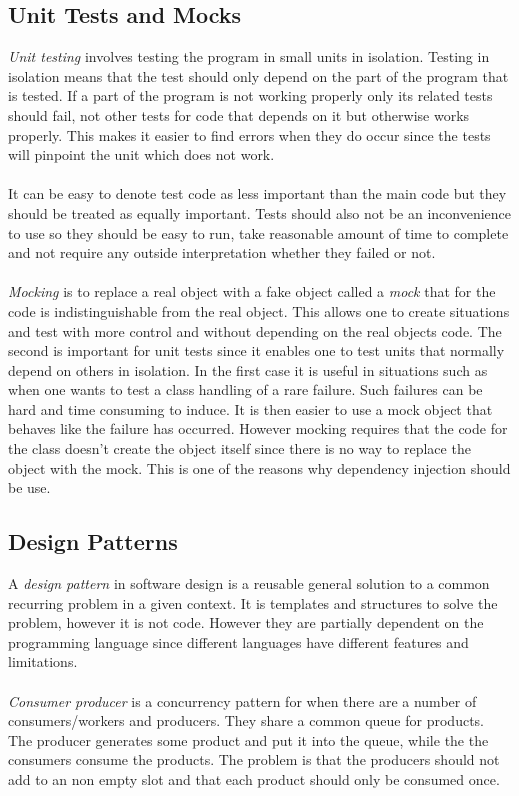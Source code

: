 \documentclass[10pt,a4paper]{report}
\begin{document}
\subsection{Unit Tests and Mocks}
\emph{Unit testing} involves testing the program in small units in isolation. Testing in isolation means that the test should only depend on the part of the program that is tested. If a part of the program is not working properly only its related tests should fail, not other tests for code that depends on it but otherwise works properly. This makes it easier to find errors when they do occur since the tests will pinpoint the unit which does not work.\cite{cleancode2008}\\
\\
It can be easy to denote test code as less important than the main code but they should be treated as equally important. Tests should also not be an inconvenience to use so they should be easy to run, take reasonable amount of time to complete and not require any outside interpretation whether they failed or not.\cite{cleancode2008}\\
\\
\emph{Mocking} is to replace a real object with a fake object called a \emph{mock} that for the code is indistinguishable from the real object. This allows one to create situations and test with more control and without depending on the real objects code. The second is important for unit tests since it enables one to test units that normally depend on others in isolation. In the first case it is useful in situations such as when one wants to test a class handling of a rare failure. Such failures can be hard and time consuming to induce. It is then easier to use a mock object that behaves like the failure has occurred. However mocking requires that the code for the class doesn't create the object itself since there is no way to replace the object with the mock. This is one of the reasons why dependency injection should be use.\cite{cleancode2008}

\subsection{Design Patterns}
\label{design_pattern}
A \emph{design pattern} in software design is a reusable general solution to a common recurring problem in a given context. It is templates and structures to solve the problem, however it is not code. However they are partially dependent on the programming language since different languages have different features and limitations.\cite{design_patterns}\\
\\
\emph{Consumer producer} is a concurrency pattern for when there are a number of consumers/workers and producers. They share a common queue for products. The producer generates some product and put it into the queue, while the the consumers consume the products. The problem is that the producers should not add to an non empty slot and that each product should only be consumed once.\cite{cleancode2008, design_patterns}
\end{document}
